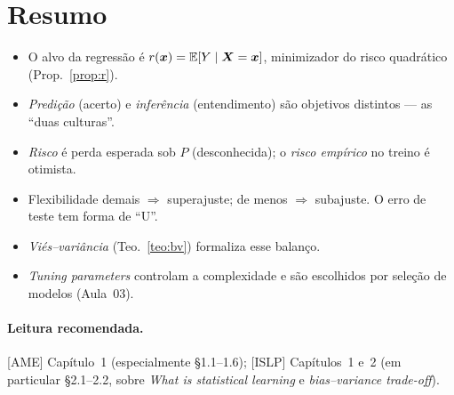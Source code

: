 \documentclass[11pt,a4paper]{article}
\begin{document}
\section*{Resumo}
\begin{itemize}[leftmargin=1.4cm]
  \item O alvo da regressão é $r(\bm{x})=\mathbb{E}[Y\mid\bm{X}=\bm{x}]$, minimizador do risco
        quadrático (Prop.~\ref{prop:r}).
  \item \emph{Predição} (acerto) e \emph{inferência} (entendimento) são objetivos
        distintos --- as ``duas culturas''.
  \item \emph{Risco} é perda esperada sob $P$ (desconhecida); o \emph{risco
        empírico} no treino é otimista.
  \item Flexibilidade demais $\Rightarrow$ superajuste; de menos $\Rightarrow$
        subajuste. O erro de teste tem forma de ``U''.
  \item \emph{Viés--variância} (Teo.~\ref{teo:bv}) formaliza esse balanço.
  \item \emph{Tuning parameters} controlam a complexidade e são escolhidos por
        seleção de modelos (Aula~03).
\end{itemize}

\paragraph{Leitura recomendada.} [AME] Capítulo~1 (especialmente §1.1--1.6);
[ISLP] Capítulos~1 e~2 (em particular §2.1--2.2, sobre \emph{What is statistical
learning} e \emph{bias--variance trade-off}).
\end{document}
